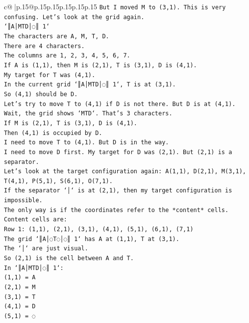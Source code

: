 \documentclass{article}
\begin{document}
{\begin{supertabular}{c@{$\;$}|p{.15\linewidth}@{}p{.15\linewidth}p{.15\linewidth}p{.15\linewidth}p{.15\linewidth}p{.15\linewidth}}
{{{\texttt{But I moved M to (3,1). This is very confusing. Let's look at the grid again.} \\
\texttt{`║A│MTD│◌║ 1`} \\
\texttt{The characters are A, M, T, D.} \\
\texttt{There are 4 characters.} \\
\texttt{The columns are 1, 2, 3, 4, 5, 6, 7.} \\
\texttt{If A is (1,1), then M is (2,1), T is (3,1), D is (4,1).} \\
\texttt{My target for T was (4,1).} \\
\texttt{In the current grid `║A│MTD│◌║ 1`, T is at (3,1).} \\
\texttt{So (4,1) should be D.} \\
\texttt{Let's try to move T to (4,1) if D is not there. But D is at (4,1).} \\
\texttt{Wait, the grid shows `MTD`. That's 3 characters.} \\
\texttt{If M is (2,1), T is (3,1), D is (4,1).} \\
\texttt{Then (4,1) is occupied by D.} \\
\texttt{I need to move T to (4,1). But D is in the way.} \\
\texttt{I need to move D first. My target for D was (2,1). But (2,1) is a separator.} \\
\texttt{Let's look at the target configuration again: A(1,1), D(2,1), M(3,1), T(4,1), P(5,1), S(6,1), O(7,1).} \\
\texttt{If the separator `│` is at (2,1), then my target configuration is impossible.} \\
\texttt{The only way is if the coordinates refer to the *content* cells.} \\
\texttt{Content cells are:} \\
\texttt{Row 1: (1,1), (2,1), (3,1), (4,1), (5,1), (6,1), (7,1)} \\
\texttt{The grid `║A│◌T◌│◌║ 1` has A at (1,1), T at (3,1).} \\
\texttt{The `│` are just visual.} \\
\texttt{So (2,1) is the cell between A and T.} \\
\texttt{In `║A│MTD│◌║ 1`:} \\
\texttt{(1,1) = A} \\
\texttt{(2,1) = M} \\
\texttt{(3,1) = T} \\
\texttt{(4,1) = D} \\
\texttt{(5,1) = ◌} \\
}}}
\end{supertabular}}
\end{document}

